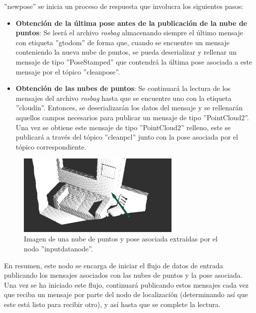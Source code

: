 \documentclass[12pt, a4paper, twoside]{article}
\begin{document}
\begin{itemize}
  ''new\textunderscore pose'' se inicia un proceso de respuesta que involucra los siguientes pasos:
  \begin{itemize}
    \item \textbf{Obtención de la última pose antes de la publicación de la nube de puntos}: Se leerá el archivo \textit{rosbag} almacenando siempre el último mensaje con etiqueta 
    ''gt\textunderscore odom'' de forma que, cuando se encuentre un mensaje conteniendo la nueva nube de puntos, se pueda deserializar y rellenar un mensaje de tipo ''PoseStamped'' 
    que contendrá la última pose asociada a este mensaje por el tópico ''clean\textunderscore pose''.
    \item \textbf{Obtención de las nubes de puntos}: Se continuará la lectura de los mensajes del archivo \textit{rosbag} hasta que se encuentre uno con la etiqueta 
    ''cloud\textunderscore in''. Entonces, se deserializarán los datos del mensaje y se rellenarán aquellos campos necesarios para publicar un mensaje de tipo ''PointCloud2''.
    Una vez se obtiene este mensaje de tipo ''PointCloud2'' relleno, este se publicará a través del tópico ''clean\textunderscore pcl'' junto con la pose asociada por el tópico 
    correspondiente.
  \end{itemize}
\end{itemize}
\begin{figure}[h]
  \centering
    \includegraphics[width=0.7\textwidth]{rosbag_output.png}
  \caption{Imagen de una nube de puntos y pose asociada extraídas por el nodo ''input\textunderscore data\textunderscore node''.}
\end{figure}
En resumen, este nodo se encarga de iniciar el flujo de datos de entrada publicando los mensajes asociados con las nubes de puntos y la pose asociada. Una vez se ha iniciado
este flujo, continuará publicando estos mensajes cada vez que reciba un mensaje por parte del nodo de localización (determinando así que este está listo para recibir otro),
y así hasta que se complete la lectura.
\end{document}
